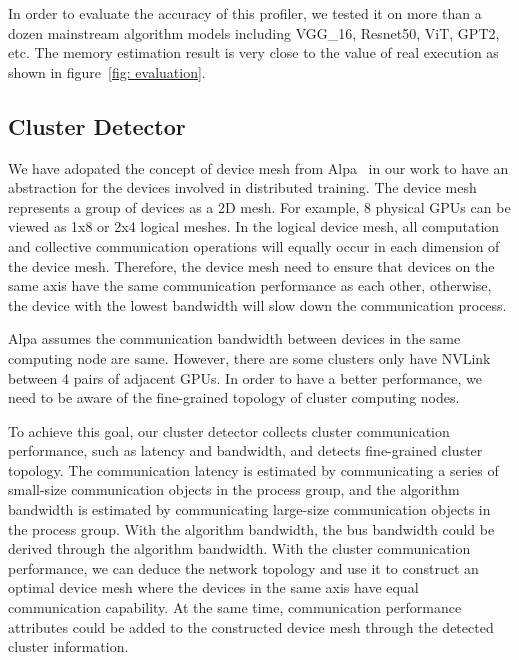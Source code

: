 

In order to evaluate the accuracy of this profiler, we tested it on more than a dozen mainstream algorithm models including VGG\_16, Resnet50, ViT, GPT2, etc. The memory estimation result is very close to the value of real execution as shown in figure~\ref{fig: evaluation}.


\subsection{Cluster Detector}

We have adopated the concept of device mesh from Alpa~\cite{zheng2022alpa} in our work to have an abstraction for the devices involved in distributed training. The device mesh represents a group of devices as a 2D mesh. For example, 8 physical GPUs can be viewed as 1x8 or 2x4 logical meshes. In the logical device mesh, all computation and collective communication operations will equally occur in each dimension of the device mesh. Therefore, the device mesh need to ensure that devices on the same axis have the same communication performance as each other, otherwise, the device with the lowest bandwidth will slow down the communication process.

Alpa assumes the communication bandwidth between devices in the same computing node are same. However, there are some clusters only have NVLink between 4 pairs of adjacent GPUs. In order to have a better performance, we need to be aware of the fine-grained topology of cluster computing nodes.

To achieve this goal, our cluster detector collects cluster communication performance, such as latency and bandwidth, and detects fine-grained cluster topology. The communication latency is estimated by communicating a series of small-size communication objects in the process group, and the algorithm bandwidth is estimated by communicating large-size communication objects in the process group. With the algorithm bandwidth, the bus bandwidth could be derived through the algorithm bandwidth. With the cluster communication performance, we can deduce the network topology and use it to construct an optimal device mesh where the devices in the same axis have equal communication capability. At the same time, communication performance attributes could be added to the constructed device mesh through the detected cluster information.

